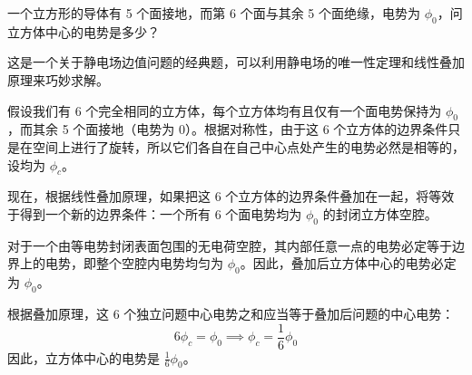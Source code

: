 \begin{exercise}\label{ex:15.4}
一个立方形的导体有 5 个面接地，而第 6 个面与其余 5 个面绝缘，电势为 $\phi_0$，问立方体中心的电势是多少？
\end{exercise}
\begin{solution}
这是一个关于静电场边值问题的经典题，可以利用静电场的唯一性定理和线性叠加原理来巧妙求解。

假设我们有 6 个完全相同的立方体，每个立方体均有且仅有一个面电势保持为 $\phi_0$，而其余 5 个面接地（电势为 0）。根据对称性，由于这 6 个立方体的边界条件只是在空间上进行了旋转，所以它们各自在自己中心点处产生的电势必然是相等的，设均为 $\phi_c$。

现在，根据线性叠加原理，如果把这 6 个立方体的边界条件叠加在一起，将等效于得到一个新的边界条件：一个所有 6 个面电势均为 $\phi_0$ 的封闭立方体空腔。

对于一个由等电势封闭表面包围的无电荷空腔，其内部任意一点的电势必定等于边界上的电势，即整个空腔内电势均匀为 $\phi_0$。因此，叠加后立方体中心的电势必定为 $\phi_0$。

根据叠加原理，这 6 个独立问题中心电势之和应当等于叠加后问题的中心电势：
$$ 6 \phi_c = \phi_0 \implies \phi_c = \frac{1}{6} \phi_0 $$
因此，立方体中心的电势是 $\frac{1}{6} \phi_0$。
\end{solution}

